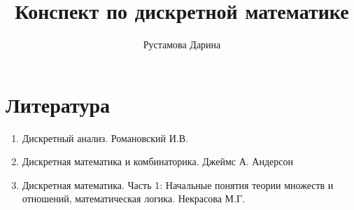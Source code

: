 \documentclass[12pt]{report}
\title{
    Конспект по дискретной математике \\ 
}
\author{
    Рустамова Дарина
}
\date{\the\year}
\begin{document}
\maketitle
\tableofcontents

\newcommand\shortlorem{}

\newpage















\chapter*{Литература}   
\begin{enumerate}
    \item Дискретный анализ. Романовский И.В.
    \item Дискретная математика и комбинаторика. Джеймс А. Андерсон
    \item Дискретная математика. Часть 1: Начальные понятия теории множеств и отношений,
    математическая логика. Некрасова М.Г.
\end{enumerate}

\shortlorem
\end{document}
